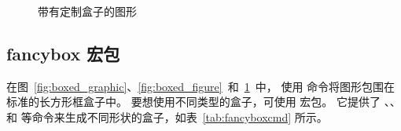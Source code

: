 \begin{figure}
	\centering
	\setlength{\fboxrule}{3pt}
	\setlength{\fboxsep}{1cm}
	\caption{带有定制盒子的图形}
	\label{fig:boxed_custom}
\end{figure}

\subsection{fancybox 宏包} \label{ssec:fancybox}



在图~\ref{fig:boxed_graphic}、\ref{fig:boxed_figure}~和~\ref{fig:boxed_custom}~中，
使用  命令将图形包围在标准的长方形框盒子中。
要想使用不同类型的盒子，可使用  宏包。
它提供了 、、 和  等命令来生成不同形状的盒子，如表~\ref{tab:fancyboxcmd} 所示。

